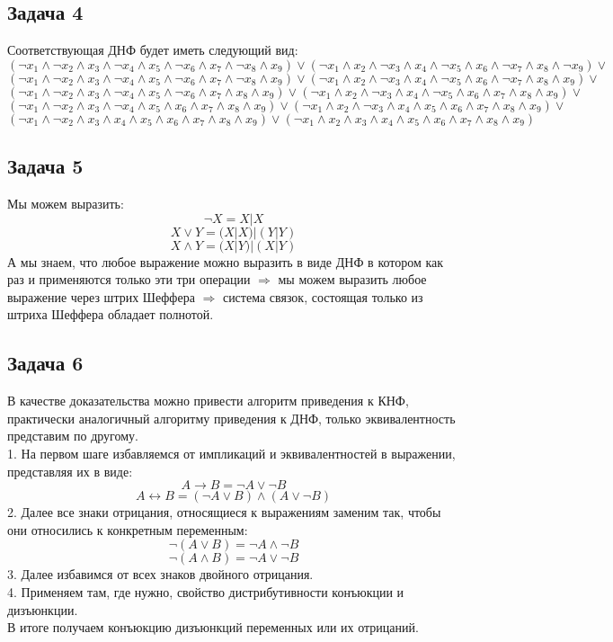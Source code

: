 	\subsection{Задача 4}
	Соответствующая ДНФ будет иметь следующий вид:
	\[
		(\lnot x_1 \land \lnot x_2 \land x_3 \land \lnot x_4 \land x_5 \land \lnot x_6 \land x_7 \land \lnot x_8 \land x_9) \lor(\lnot x_1 \land x_2 \land \lnot x_3 \land x_4 \land \lnot x_5 \land x_6 \land \lnot x_7 \land x_8 \land \lnot x_9) \lor
	\]
	\[
		(\lnot x_1 \land \lnot x_2 \land x_3 \land \lnot x_4 \land x_5 \land \lnot x_6 \land x_7 \land \lnot x_8 \land x_9) \lor(\lnot x_1 \land x_2 \land \lnot x_3 \land x_4 \land \lnot x_5 \land x_6 \land \lnot x_7 \land x_8 \land x_9) \lor
	\]
	\[
		(\lnot x_1 \land \lnot x_2 \land x_3 \land \lnot x_4 \land x_5 \land \lnot x_6 \land x_7 \land x_8 \land x_9) \lor(\lnot x_1 \land x_2 \land \lnot x_3 \land x_4 \land \lnot x_5 \land x_6 \land x_7 \land x_8 \land x_9) \lor
	\]
	\[
		(\lnot x_1 \land \lnot x_2 \land x_3 \land \lnot x_4 \land x_5 \land x_6 \land x_7 \land x_8 \land x_9) \lor(\lnot x_1 \land x_2 \land \lnot x_3 \land x_4 \land x_5 \land x_6 \land x_7 \land x_8 \land x_9) \lor
	\]
	\[
		(\lnot x_1 \land \lnot x_2 \land x_3 \land x_4 \land x_5 \land x_6 \land x_7 \land x_8 \land x_9) \lor(\lnot x_1 \land x_2 \land x_3 \land x_4 \land x_5 \land x_6 \land x_7 \land x_8 \land x_9)
	\]
	
	\subsection{Задача 5}
	Мы можем выразить: 
	\[
		\lnot X = X | X
	\]
	\[
		X \lor Y = (X|X)|(Y|Y)
	\]
	\[
		X \land Y = (X|Y)|(X|Y)
	\]
	А мы знаем, что любое выражение можно выразить в виде ДНФ в котором как раз и применяются только эти три операции $\Rightarrow$ мы можем выразить любое выражение через штрих Шеффера $\Rightarrow$ система связок, состоящая только из штриха Шеффера обладает полнотой. 
	
	\subsection{Задача 6}
	В качестве доказательства можно привести алгоритм приведения к КНФ, практически аналогичный алгоритму приведения к ДНФ, только эквивалентность представим по другому. \\
	1. На первом шаге избавляемся от импликаций и эквивалентностей в выражении, представляя их в виде: 
	\[
		A \rightarrow B = \lnot A \lor \lnot B
	\]
	\[
		A \leftrightarrow B = (\lnot A  \lor B) \land (A \lor \lnot B)
	\]
	2. Далее все знаки отрицания, относящиеся к выражениям заменим так, чтобы они относились к конкретным переменным: 
	\[
		\lnot(A \lor B) = \lnot A \land \lnot B
	\]
	\[
		\lnot(A \land B) = \lnot A \lor \lnot B
	\]
	3. Далее избавимся от всех знаков двойного отрицания. \\
	4. Применяем там, где нужно, свойство дистрибутивности  конъюкции и дизъюнкции. \\
	
	В итоге получаем конъюкцию дизъюнкций переменных или их отрицаний. 
